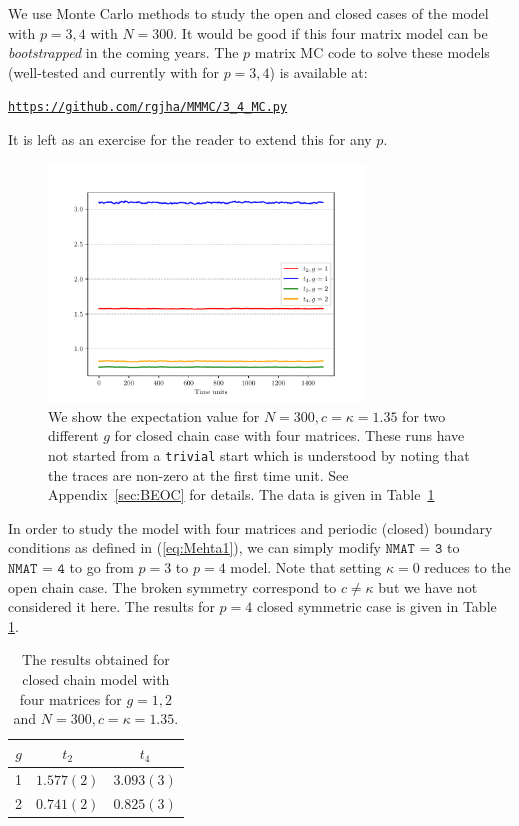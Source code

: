\documentclass[letter,11pt]{article}
\begin{document}
We use Monte Carlo methods to study the open and closed cases of the model with $p = 3,4$ with $N = 300$. It would be good if this four matrix model can be \textit{bootstrapped} in the coming years. The $p$ matrix MC code to solve these models (well-tested and currently with for $p = 3,4$) is available at: 
\begin{center} \texttt{\href{https://github.com/rgjha/MMMC/3\_4\ _MC.py}{https://github.com/rgjha/MMMC/3\_4\_MC.py}} \end{center}
It is left as an exercise for the reader to extend this for any $p$. 
\begin{figure}[htbp] 
	\centering 
	\includegraphics[width=0.75\textwidth]{figs/4MM_g1_g2.pdf}
\caption{\label{fig:4MM_closed1} We show the expectation value for $N=300, c=\kappa=1.35$ for two different $g$ for closed chain case with four matrices. These runs have not started from a \texttt{trivial} start
	which is understood by noting that the traces are non-zero at the first time unit. See Appendix~\ref{sec:BEOC} for details. The data is given in Table~\ref{table:4mchain_data}}
\end{figure}
In order to study the model with four matrices and periodic (closed) boundary conditions 
as defined in (\ref{eq:Mehta1}), we can simply modify $\texttt{NMAT = 3}$ to  $\texttt{NMAT = 4}$ to go from $p=3$ to $p=4$ model.  Note that setting $\kappa=0$ reduces to the open chain case. The broken symmetry correspond to $ c \neq \kappa$ but we have not considered it here. The results for $p=4$ closed symmetric case is given in Table \ref{table:4mchain_data}. 
\begin{table}[h!]
	\centering
	\begin{tabular}{||c c c||} 
		\hline
		$g$ & $ t_2 $ & $t_4 $ \\ [0.5ex] 
		\hline\hline
		1 & $ 1.577(2) $ & $3.093(3)$ \\
		2 & $ 0.741(2)$ & $0.825(3) $  
		\\ [1ex] 
		\hline 
	\end{tabular}
	\caption{The results obtained for closed chain model with four matrices for $g=1,2$ and $N=300, c=\kappa=1.35$.}
	\label{table:4mchain_data}
\end{table}
\end{document}

